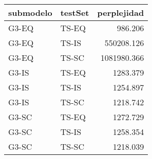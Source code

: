 \begin{tabular}{llr}
\toprule
submodelo & testSet &  perplejidad \\
\midrule
    G3-EQ &   TS-EQ &      986.206 \\
    G3-EQ &   TS-IS &   550208.126 \\
    G3-EQ &   TS-SC &  1081980.366 \\
    G3-IS &   TS-EQ &     1283.379 \\
    G3-IS &   TS-IS &     1254.897 \\
    G3-IS &   TS-SC &     1218.742 \\
    G3-SC &   TS-EQ &     1272.729 \\
    G3-SC &   TS-IS &     1258.354 \\
    G3-SC &   TS-SC &     1218.039 \\
\bottomrule
\end{tabular}
